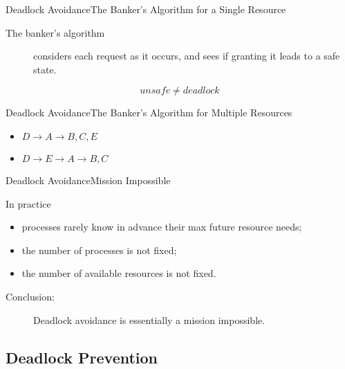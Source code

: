 \begin{frame}{Deadlock Avoidance}{The Banker's Algorithm for a Single Resource}
  \begin{description}
  \item[The banker's algorithm] considers each request as it occurs, and sees if granting
    it leads to a safe state.
  \end{description}
  \begin{center}
     
  \end{center}
  $$unsafe \neq deadlock$$
\end{frame}

\begin{frame}{Deadlock Avoidance}{The Banker's Algorithm for Multiple Resources}
  \begin{center}
     
  \end{center}
  \begin{itemize}
  \item[] $ D\rightarrow{}A\rightarrow{}B,C,E$
  \item[] $ D\rightarrow{}E\rightarrow{}A\rightarrow{}B,C$
  \end{itemize}
\end{frame}

\begin{frame}{Deadlock Avoidance}{Mission Impossible}
  \begin{block}{In practice}
    \begin{itemize}
    \item processes rarely know in advance their max future resource needs;
    \item the number of processes is not fixed;
    \item the number of available resources is not fixed.
    \end{itemize}
    \begin{description}
    \item[Conclusion:] Deadlock avoidance is essentially a mission impossible.
    \end{description}
  \end{block}
\end{frame}

\subsection{Deadlock Prevention}
\label{sec:deadlock-prevention}

